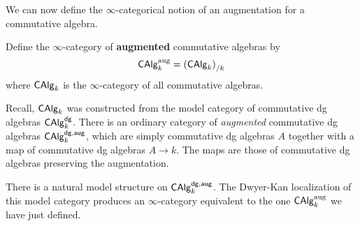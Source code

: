 \documentclass[11pt]{amsart}
\begin{document}
We can now define the $\infty$-categorical notion of an augmentation for a commutative algebra. 

\begin{dfn}
Define the $\infty$-category of {\bf augmented} commutative algebras by
\[
{\sf CAlg}_k^{\rm aug} = \left({\sf CAlg}_k\right)_{/k} 
\]
where ${\sf CAlg}_k$ is the $\infty$-category of all commutative algebras. 
\end{dfn}

\begin{rmk}
Recall, ${\sf CAlg}_k$ was constructed from the model category of commutative dg algebras ${\sf CAlg}^{\sf dg}_k$. 
There is an ordinary category of {\em augmented} commutative dg algebras ${\sf CAlg}_k^{\sf dg,aug}$, which are simply commutative dg algebras $A$ together with a map of commutative dg algebras $A \to k$. 
The maps are those of commutative dg algebras preserving the augmentation. 

There is a natural model structure on ${\sf CAlg}_k^{\sf dg,aug}$. 
The Dwyer-Kan localization of this model category produces an $\infty$-category equivalent to the one ${\sf CAlg}^{\rm aug}_k$ we have just defined. 
\end{rmk}
\end{document}
